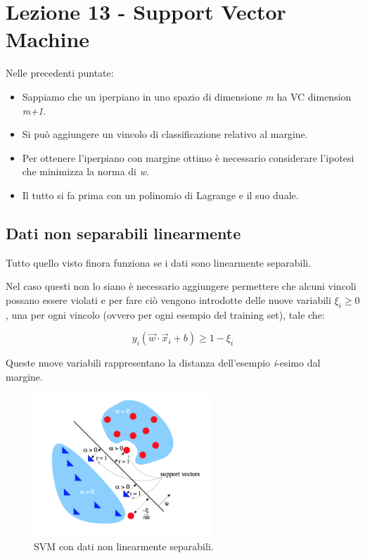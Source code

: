 \section{Lezione 13 - Support Vector Machine}\label{lezione-13---support-vector-machine}

Nelle precedenti puntate:

\begin{itemize}
\item
  Sappiamo che un iperpiano in uno spazio di dimensione \textit{m} ha VC
  dimension \textit{m+1}.
\item
  Si può aggiungere un vincolo di classificazione relativo al margine.
\item
  Per ottenere l'iperpiano con margine ottimo è necessario considerare
  l'ipotesi che minimizza la norma di \emph{w}.
\item
  Il tutto si fa prima con un polinomio di Lagrange e il suo duale.
\end{itemize}

\subsection{Dati non separabili linearmente}\label{dati-non-separabili-linearmente}

Tutto quello visto finora funziona se i dati sono linearmente
separabili.

Nel caso questi non lo siano è necessario aggiungere permettere che alcuni vincoli possano essere violati e per fare ciò vengono introdotte delle nuove variabili $\xi_i \geq 0$, una per ogni vincolo (ovvero per ogni esempio del training set), tale che:

$$ y_i (\vec{w} \cdot \vec{x}_i + b) \geq 1 - \xi_i $$

Queste nuove variabili rappresentano la distanza dell'esempio \textit{i}-esimo dal margine.

\begin{figure}[htbp]
\centering
\includegraphics[width = 0.6\textwidth]{./notes/immagini/l13-non-linear.png}
\caption{SVM con dati non linearmente separabili.}
\end{figure}

